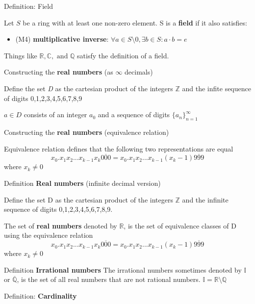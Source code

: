 \documentclass{article}
\newcommand*{\Z}{\mathbb{Z}}
\newcommand*{\Q}{\mathbb{Q}}
\newcommand*{\I}{\mathbb{I}}
\newcommand*{\R}{\mathbb{R}}
\newcommand*{\C}{\mathbb{C}}
\begin{document}
Definition: Field

Let \(S\) be a ring with at least one non-zero element. S is a \textbf{field} if it also satisfies:
\begin{itemize}
    \item (M4) \textbf{multiplicative inverse}: \(\forall a \in S\setminus {0}, \exists b \in S: a \cdot b = e\)
\end{itemize}

Things like \(\R, \C, \text{ and } \Q\) satisfy the definition of a field.

\vspace{\baselineskip}
Constructing the \textbf{real numbers} (as \(\infty\) decimals)

Define the set \textit{D} as the cartesian product of the integers \(\Z\) and the infite sequence of digits {0,1,2,3,4,5,6,7,8,9}

\(a\in D\) consists of an integer \(a_0\) and a sequence of digits \(\{a_n\}^{\infty}_{n=1}\)

\vspace{\baselineskip}
Constructing the \textbf{real numbers} (equivalence relation)

Equivalence relation defines that the following two representations are equal
\begin{equation}
    x_0.x_1x_2...x_{k-1}x_k\overline{000} = x_0.x_1x_2...x_{k-1}(x_k-1)\overline{999}
\end{equation}
where \(x_k \neq 0\)

\vspace{\baselineskip}
Definition \textbf{Real numbers} (infinite decimal version)

Define the set D as the cartesian product of the integers \(\Z\) and the infinite sequence of digits {0,1,2,3,4,5,6,7,8,9}.

The set of \textbf{real numbers} denoted by \(\R\), is the set of equivalence classes of D using the equivalence relation
\begin{equation}
    x_0.x_1x_2...x_{k-1}x_k\overline{000} = x_0.x_1x_2...x_{k-1}(x_k-1)\overline{999}
\end{equation}
where \(x_k \neq 0\)

\vspace{\baselineskip}
Definition \textbf{Irrational numbers}
The irrational numbers sometimes denoted by \(\I\) or \(\overline{\Q}\), is the set of all real numbers that are not rational numbers. \(\I = \R \setminus \Q\)

\vspace{\baselineskip}
Definition: \textbf{Cardinality}
\end{document}
